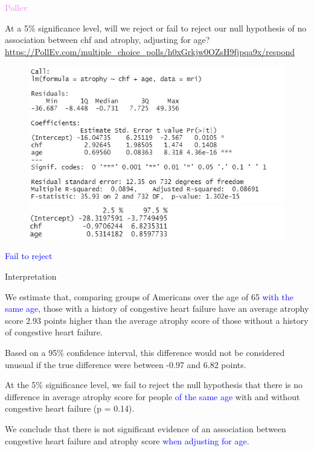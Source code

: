 \documentclass[10pt,t]{beamer}
\begin{document}
\begin{frame}{\textcolor{violet}{Pollev}}
	\vspace{-5 mm}
	
	At a 5\% significance level, will we reject or fail to reject our null hypothesis of no association between chf and atrophy, adjusting for age? {\scriptsize \url{https://PollEv.com/multiple_choice_polls/h0xGrkjw0OZsH9fjpqa9x/respond}}
	
		\begin{figure}
		\includegraphics[scale = 0.53]{figures/mri_multiple_eg1}
		
		\includegraphics[scale = 0.57]{figures/mri_multiple_cis}
	\end{figure}\pause

\textcolor{blue}{Fail to reject}
	
\end{frame}

\begin{frame}{Interpretation}


We estimate that, comparing groups of Americans over the age of 65 \textcolor{blue}{with the same age}, those with a history of congestive heart failure have an average atrophy score 2.93 points higher than the average atrophy score of those without a history of congestive heart failure.

\bigskip

Based on a 95\% confidence interval, this difference would not be considered unusual if the true difference were between -0.97 and 6.82 points. 

\bigskip

At the 5\% significance level, we fail to reject the null hypothesis that there is no difference in average atrophy score for people \textcolor{blue}{of the same age} with and without congestive heart failure (p = 0.14). 

\bigskip

We conclude that there is not significant evidence of an association between congestive heart failure and atrophy score \textcolor{blue}{when adjusting for age}. 

\end{frame}
\end{document}
